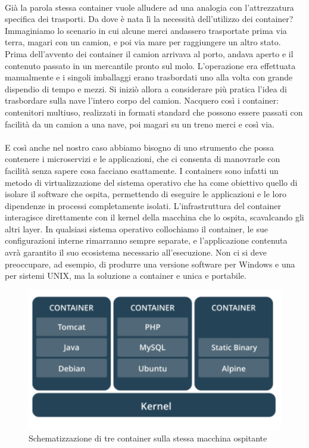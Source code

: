 \paragraph{}
Già la parola stessa container vuole alludere ad una analogia con l'attrezzatura specifica dei trasporti. Da dove è nata lì la necessità dell'utilizzo dei container? Immaginiamo lo scenario in cui alcune merci andassero trasportate prima via terra, magari con un camion, e poi via mare per raggiungere un altro stato. Prima dell'avvento dei container il camion arrivava al porto, andava aperto e il contenuto passato in un mercantile pronto sul molo. L'operazione era effettuata manualmente e i singoli imballaggi erano trasbordati uno alla volta con grande dispendio di tempo e mezzi. Si iniziò allora a considerare più pratica l'idea di trasbordare sulla nave l'intero corpo del camion. Nacquero così i container: contenitori multiuso, realizzati in formati standard che possono essere passati con facilità da un camion a una nave, poi magari su un treno merci e così via.

\paragraph{}
E così anche nel nostro caso abbiamo bisogno di uno strumento che possa contenere i microservizi e le applicazioni, che ci consenta di manovrarle con facilità senza sapere cosa facciano esattamente.
I containers sono infatti un metodo di virtualizzazione del sistema operativo che ha come obiettivo quello di isolare il software che ospita, permettendo di eseguire le applicazioni e le loro dipendenze in processi completamente isolati. L'infrastruttura del container interagisce direttamente con il kernel della macchina che lo ospita, scavalcando gli altri layer. In qualsiasi sistema operativo collochiamo il container, le sue configurazioni interne rimarranno sempre separate, e l'applicazione contenuta avrà garantito il suo ecosistema necessario all'esecuzione. Non ci si deve preoccupare, ad esempio, di produrre una versione software per Windows e una per sistemi UNIX, ma la soluzione a container e unica e portabile. 

\begin{figure}[h!]
	\centering
	\includegraphics[width=\textwidth,keepaspectratio=true]{capitoli/imgs/container.PNG}
	\caption{Schematizzazione di tre container sulla stessa macchina ospitante}
\end{figure}

